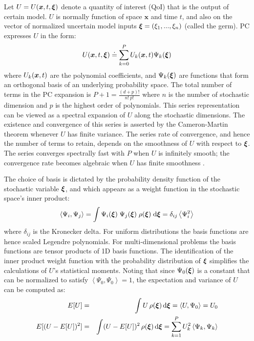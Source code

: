Let $U=U(\bm{x},t,\xxi)$ denote a quantity of 
interest (QoI) that is the output of certain model.
$U$ is normally function of space $\bm{x}$ and time $t$, and 
also on the vector of normalized uncertain model inputs $\xxi=(\xi_1,...,\xi_n)$ (called the germ). PC expresses $U$ in the form:
\begin{equation}
  U(\xbold,t,\xxi) \doteq \sum_{k = 0}^P U_k(\xbold,t) \Psi_k(\xxi)
\label{eq:stochseries}
\end{equation} 
where $U_k(\xbold,t)$ are the polynomial coefficients, and
$\Psi_k(\xxi)$ are functions that form an orthogonal basis of an underlying probability
space. The total number of terms in the PC expansion is
$P+1 = \frac{(d+p)! }{n!\ p!}$ where $n$ is the number of stochastic dimension and $p$ is the highest order
of polynomials. 
This series representation can be viewed as a spectral expansion
of $U$ along the stochastic dimensions.  The existence and convergence of this series
is asserted by the Cameron-Martin theorem
\citep{Cameron:1947}  whenever $U$ has finite variance. The series rate of convergence, and
hence the number of terms to retain, depends on the smoothness of
$U$ with respect to $\xxi$. The series converges spectrally fast with $P$
when $U$ is infinitely smooth; the convergence rate becomes algebraic
when $U$ has finite smoothness \citep{Canuto:2006}. 

The choice of basis is dictated by the probability density
function of the stochastic variable $\xxi$, and which appears as a weight
function in the stochastic space's inner product:
\begin{equation}
 \left<\Psi_i,\Psi_j\right> = \int \Psi_i(\xxi) \;\Psi_j(\xxi) \; \rho(\xxi) \; \mbox{d}\xxi=\delta_{ij}\ave{\Psi_i^2}
\label{eq:inner}
\end{equation}
where $\delta_{ij}$ is the Kronecker delta.
For uniform
distributions the basis functions are hence scaled Legendre polynomials.
For multi-dimensional problems the basis functions are
tensor products of 1D basis functions. The identification of the inner product weight function
with the probability distribution of $\xxi$ simplifies the calculations of $U$'s statistical moments.
Noting that since $\Psi_0(\xxi)$ is a constant that can be normalized to satisfy 
$\left<\Psi_0,\Psi_0\right>=1$, the expectation and variance of $U$ can be computed as:
\begin{eqnarray}
 E[U]&=&\int U \, \rho(\xxi) \, \mbox{d}\xxi=\left< U,\Psi_0\right> = U_0  
 \label{eq:mean} \\
 E[(U-E[U])^2]&=&\int (U-E[U])^2 \, \rho(\xxi) \, \mbox{d}\xxi=\sum_{k=1}^P U_k^2
 \label{eq:sigma}
\left<\Psi_k,\Psi_k\right>
\end{eqnarray}

